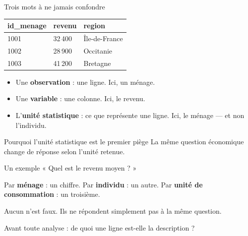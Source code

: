 \documentclass[10pt,aspectratio=169]{beamer}
\begin{document}
\begin{frame}{Trois mots à ne jamais confondre}
\begin{center}
\begin{tabular}{lll}
\toprule
\textbf{id\_menage} & \textbf{revenu} & \textbf{region} \\
\midrule
1001 & 32\,400 & Île-de-France \\
1002 & 28\,900 & Occitanie \\
1003 & 41\,200 & Bretagne \\
\bottomrule
\end{tabular}
\end{center}

\vspace{1.5em}
\begin{itemize}
  \item Une \textbf{observation} : une ligne. Ici, un ménage.
  \item Une \textbf{variable} : une colonne. Ici, le revenu.
  \item L'\textbf{unité statistique} : ce que représente une ligne. Ici, le ménage --- et non l'individu.
\end{itemize}
\end{frame}

\begin{frame}{Pourquoi l'unité statistique est le premier piège}
La même question économique change de réponse selon l'unité retenue.

\vspace{1.2em}
\begin{block}{Un exemple}
« Quel est le revenu moyen ? »

\vspace{0.5em}
Par \textbf{ménage} : un chiffre. Par \textbf{individu} : un autre. Par \textbf{unité de consommation} : un troisième.

\vspace{0.5em}
Aucun n'est faux. Ils ne répondent simplement pas à la même question.
\end{block}

\vspace{1.2em}
Avant toute analyse : \alert{de quoi une ligne est-elle la description ?}
\end{frame}
\end{document}
